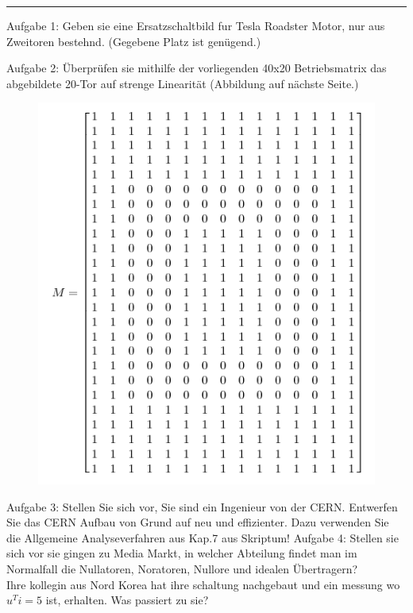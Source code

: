 \documentclass[12pt]{exam}
\renewcommand*\half{.5}
\begin{document}
	\noindent
	\rule[1ex]{\textwidth}{1pt}
	\begin{questions}
		\question[\half]Aufgabe 1: Geben sie eine Ersatzschaltbild fur Tesla Roadster Motor, nur aus Zweitoren bestehnd. (Gegebene Platz ist genügend.)
\makeemptybox{2in}
		
		\question[\half]Aufgabe 2: Überprüfen sie mithilfe der vorliegenden 40x20 Betriebsmatrix das abgebildete 20-Tor auf strenge Linearität (Abbildung auf nächste Seite.)
\makeemptybox{2in}
		\begin{figure}[!htbp]
			\centering
			\includegraphics[width=0.7\linewidth]{matrix}
		
			
		\end{figure}
		\FloatBarrier

		\question[5] Aufgabe 3:
		Stellen Sie sich vor, Sie sind ein Ingenieur von der CERN.  Entwerfen Sie das CERN Aufbau von Grund auf neu und effizienter. Dazu verwenden Sie die Allgemeine Analyseverfahren aus Kap.7 aus Skriptum!
\makeemptybox{2in}
		\addpoints
		\question[90]Aufgabe 4:
		Stellen sie sich vor sie gingen zu Media Markt, in welcher Abteilung findet man im Normalfall die Nullatoren, Noratoren, Nullore und idealen Übertragern?
		\\
		\question[1] Ihre kollegin aus Nord Korea hat ihre schaltung nachgebaut und ein messung wo $u^Ti=5$ ist, erhalten. Was passiert zu sie?
		

\end{questions}
\end{document}

